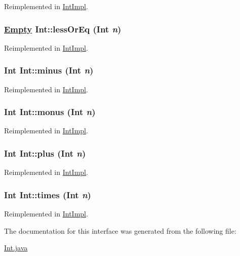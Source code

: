 Reimplemented in \hyperlink{classIntImpl_a7}{Int\-Impl}.\hypertarget{interfaceInt_a8}{
\subsubsection[lessOrEq]{\setlength{\rightskip}{0pt plus 5cm}\hyperlink{interfaceEmpty}{Empty} Int::less\-Or\-Eq (Int {\em n})}}
\label{interfaceInt_a8}




Reimplemented in \hyperlink{classIntImpl_a8}{Int\-Impl}.\hypertarget{interfaceInt_a2}{
\subsubsection[minus]{\setlength{\rightskip}{0pt plus 5cm}Int Int::minus (Int {\em n})}}
\label{interfaceInt_a2}




Reimplemented in \hyperlink{classIntImpl_a2}{Int\-Impl}.\hypertarget{interfaceInt_a3}{
\subsubsection[monus]{\setlength{\rightskip}{0pt plus 5cm}Int Int::monus (Int {\em n})}}
\label{interfaceInt_a3}




Reimplemented in \hyperlink{classIntImpl_a3}{Int\-Impl}.\hypertarget{interfaceInt_a1}{
\subsubsection[plus]{\setlength{\rightskip}{0pt plus 5cm}Int Int::plus (Int {\em n})}}
\label{interfaceInt_a1}




Reimplemented in \hyperlink{classIntImpl_a1}{Int\-Impl}.\hypertarget{interfaceInt_a4}{
\subsubsection[times]{\setlength{\rightskip}{0pt plus 5cm}Int Int::times (Int {\em n})}}
\label{interfaceInt_a4}




Reimplemented in \hyperlink{classIntImpl_a4}{Int\-Impl}.

The documentation for this interface was generated from the following file:\begin{CompactItemize}
\item 
\hyperlink{Int_8java-source}{Int.java}\end{CompactItemize}
